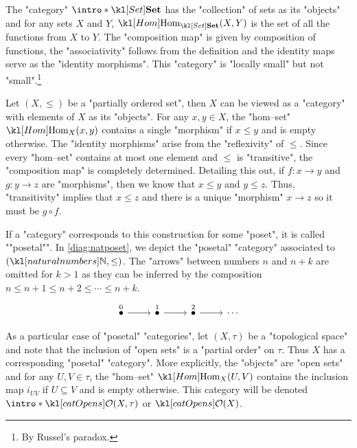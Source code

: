 \documentclass[main.tex]{subfiles}
\begin{document}
\begin{exmp}[$\catSet$]
	\AP The "category" $\intro*\catSet$ has the "collection" of sets as its "objects" and for any sets $X$ and $Y$, $\Hom_{\catSet}(X,Y)$ is the set of all the functions from $X$ to $Y$. The "composition map" is given by composition of functions, the "associativity" follows from the definition and the identity maps serve as the "identity morphisms". This "category" is "locally small" but not "small".\footnote{By Russel's paradox.}
\end{exmp}
\begin{exmp}
	Let $(X, \leq)$ be a "partially ordered set", then $X$ can be viewed as a "category" with elements of $X$ as its "objects". For any $x,y \in X$, the "hom--set" $\Hom_X(x,y)$ contains a single "morphism" if $x \leq y$ and is empty otherwise. The "identity morphisms" arise from the "reflexivity" of $\leq$. Since every "hom--set" contains at most one element and $\leq$ is "transitive", the "composition map" is completely determined. Detailing this out, if $f:x \rightarrow y$ and $g: y \rightarrow z$ are "morphisms", then we know that $x \leq y$ and $y\leq z$. Thus, "transitivity" implies that $x\leq z$ and there is a unique "morphism" $x \rightarrow z$ so it must be $g \circ f$.
	
	\AP If a "category" corresponds to this construction for some "poset", it is called ""posetal"". In \eqref{diag:natposet}, we depict the "posetal" "category" associated to $(\N, \leq)$. The "arrows" between numbers $n$ and $n+k$ are omitted for $k>1$ as they can be inferred by the composition $n \leq n+1 \leq n+2 \leq \cdots \leq n+k$.
	\begin{equation}\label{diag:natposet}
		\begin{tikzcd}
			\stackrel{0}{\bullet} \arrow[r] & \stackrel{1}{\bullet} \arrow[r] & \stackrel{2}{\bullet} \arrow[r] & \cdots
		\end{tikzcd}
	\end{equation}
	
	As a particular case of "posetal" "categories", let $(X, \tau)$ be a "topological space" and note that the inclusion of "open sets" is a "partial order" on $\tau$. Thus $X$ has a corresponding "posetal" "category". More explicitly, the "objects" are "open sets" and for any $U, V \in \tau$, the "hom--set" $\Hom_X(U,V)$ contains the inclusion map $i_{UV}$ if $U\subseteq V$ and is empty otherwise. \AP This category will be denoted $\intro*\catOpens(X,\tau)$ or $\catOpens(X)$.
\end{exmp}
\end{document}
